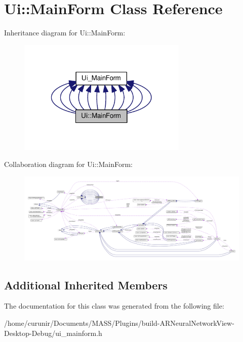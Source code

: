 \hypertarget{class_ui_1_1_main_form}{}\section{Ui\+:\+:Main\+Form Class Reference}
\label{class_ui_1_1_main_form}


Inheritance diagram for Ui\+:\+:Main\+Form\+:
\nopagebreak
\begin{figure}[H]
\begin{center}
\leavevmode
\includegraphics[width=229pt]{class_ui_1_1_main_form__inherit__graph}
\end{center}
\end{figure}


Collaboration diagram for Ui\+:\+:Main\+Form\+:
\nopagebreak
\begin{figure}[H]
\begin{center}
\leavevmode
\includegraphics[width=350pt]{class_ui_1_1_main_form__coll__graph}
\end{center}
\end{figure}
\subsection*{Additional Inherited Members}


The documentation for this class was generated from the following file\+:\begin{DoxyCompactItemize}
\item 
/home/curunir/\+Documents/\+M\+A\+S\+S/\+Plugins/build-\/\+A\+R\+Neural\+Network\+View-\/\+Desktop-\/\+Debug/ui\+\_\+mainform.\+h\end{DoxyCompactItemize}
